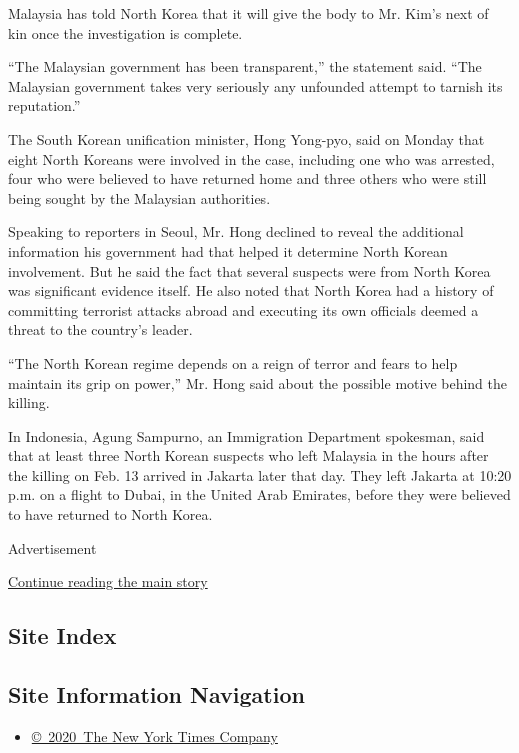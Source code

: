 Malaysia has told North Korea that it will give the body to Mr. Kim's
next of kin once the investigation is complete.

``The Malaysian government has been transparent,'' the statement said.
``The Malaysian government takes very seriously any unfounded attempt to
tarnish its reputation.''

The South Korean unification minister, Hong Yong-pyo, said on Monday
that eight North Koreans were involved in the case, including one who
was arrested, four who were believed to have returned home and three
others who were still being sought by the Malaysian authorities.

Speaking to reporters in Seoul, Mr. Hong declined to reveal the
additional information his government had that helped it determine North
Korean involvement. But he said the fact that several suspects were from
North Korea was significant evidence itself. He also noted that North
Korea had a history of committing terrorist attacks abroad and executing
its own officials deemed a threat to the country's leader.

``The North Korean regime depends on a reign of terror and fears to help
maintain its grip on power,'' Mr. Hong said about the possible motive
behind the killing.

In Indonesia, Agung Sampurno, an Immigration Department spokesman, said
that at least three North Korean suspects who left Malaysia in the hours
after the killing on Feb. 13 arrived in Jakarta later that day. They
left Jakarta at 10:20 p.m. on a flight to Dubai, in the United Arab
Emirates, before they were believed to have returned to North Korea.

Advertisement

\protect\hyperlink{after-bottom}{Continue reading the main story}

\hypertarget{site-index}{%
\subsection{Site Index}\label{site-index}}

\hypertarget{site-information-navigation}{%
\subsection{Site Information
Navigation}\label{site-information-navigation}}

\begin{itemize}
\tightlist
\item
  \href{https://help.nytimes.com/hc/en-us/articles/115014792127-Copyright-notice}{©~2020~The
  New York Times Company}
\end{itemize}

